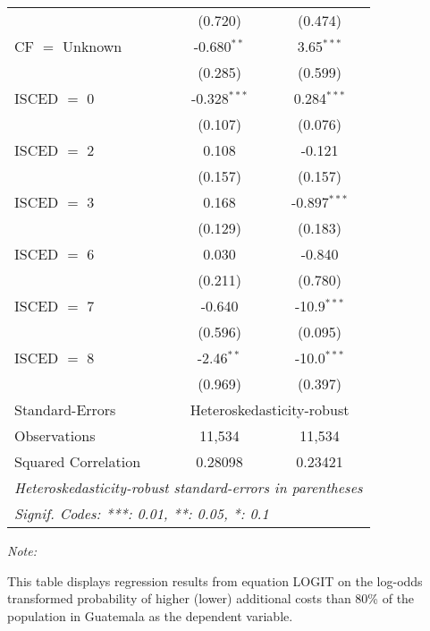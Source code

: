 \begin{table}[htbp!]
\begin{adjustbox}{width = 1\textwidth, max height = 0.95\textheight, center}
\begin{threeparttable}[b]
\begin{tabular}{lcc}
                                 & (0.720)        & (0.474)\\   
            CF $=$ Unknown       & -0.680$^{**}$  & 3.65$^{***}$\\   
                                 & (0.285)        & (0.599)\\   
            ISCED $=$ 0          & -0.328$^{***}$ & 0.284$^{***}$\\   
                                 & (0.107)        & (0.076)\\   
            ISCED $=$ 2          & 0.108          & -0.121\\   
                                 & (0.157)        & (0.157)\\   
            ISCED $=$ 3          & 0.168          & -0.897$^{***}$\\   
                                 & (0.129)        & (0.183)\\   
            ISCED $=$ 6          & 0.030          & -0.840\\   
                                 & (0.211)        & (0.780)\\   
            ISCED $=$ 7          & -0.640         & -10.9$^{***}$\\   
                                 & (0.596)        & (0.095)\\   
            ISCED $=$ 8          & -2.46$^{**}$   & -10.0$^{***}$\\   
                                 & (0.969)        & (0.397)\\   
            \midrule 
            Standard-Errors & \multicolumn{2}{c}{Heteroskedasticity-robust} \\ 
            Observations         & 11,534         & 11,534\\  
            Squared Correlation  & 0.28098        & 0.23421\\  
            \midrule \midrule
            \multicolumn{3}{l}{\emph{Heteroskedasticity-robust standard-errors in parentheses}}\\
            \multicolumn{3}{l}{\emph{Signif. Codes: ***: 0.01, **: 0.05, *: 0.1}}\\
         \end{tabular}
         
         \begin{tablenotes}\item \medskip \textit{Note:}
            \item This table displays regression results from equation LOGIT on the log-odds transformed probability of higher (lower) additional costs than 80\% of the population in Guatemala as the dependent variable. 
         \end{tablenotes}
      \end{threeparttable}
   \end{adjustbox}
\end{table}


